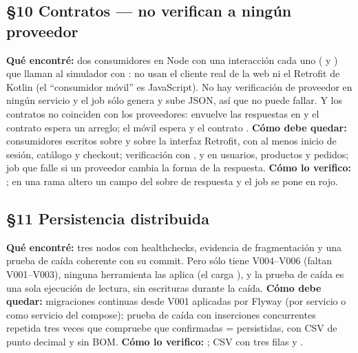 \subsection*{\S10 Contratos --- no verifican a ning\'un proveedor}
\textbf{Qu\'e encontr\'e:} dos consumidores en Node con una interacci\'on cada uno ( y ) que llaman al simulador con : no usan el cliente real de la web ni el Retrofit de Kotlin (el ``consumidor m\'ovil'' es JavaScript). No hay verificaci\'on de proveedor en ning\'un servicio y el job s\'olo genera y sube JSON, as\'i que no puede fallar. Y los contratos no coinciden con los proveedores:  envuelve las respuestas en  y el contrato espera un arreglo; el m\'ovil espera  y el contrato . \textbf{C\'omo debe quedar:} consumidores escritos sobre  y sobre la interfaz Retrofit, con al menos inicio de sesi\'on, cat\'alogo y checkout; verificaci\'on con ,  y  en usuarios, productos y pedidos; job  que falle si un proveedor cambia la forma de la respuesta. \textbf{C\'omo lo verifico:} ; en una rama altero un campo del sobre de respuesta y el job se pone en rojo.

\subsection*{\S11 Persistencia distribuida}
\textbf{Qu\'e encontr\'e:} tres nodos con healthchecks, evidencia de fragmentaci\'on y una prueba de ca\'ida coherente con su commit. Pero  s\'olo tiene V004--V006 (faltan V001--V003), ninguna herramienta las aplica (el  carga ), y la prueba de ca\'ida es una sola ejecuci\'on de lectura, sin escrituras durante la ca\'ida. \textbf{C\'omo debe quedar:} migraciones continuas desde V001 aplicadas por Flyway (por servicio o como servicio del compose); prueba de ca\'ida con inserciones concurrentes repetida tres veces que compruebe que confirmadas = persistidas, con CSV de punto decimal y sin BOM. \textbf{C\'omo lo verifico:} ; CSV con tres filas y .

